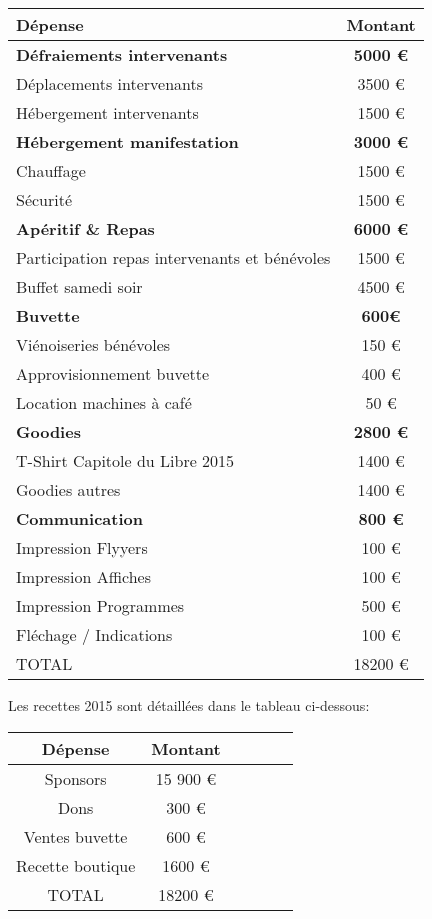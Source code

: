     \begin{tabular}{|l|c|}
        \hline Dépense & Montant \\
        \hline \textbf{Défraiements intervenants} & \textbf{5000 €} \\
        \hline Déplacements intervenants & 3500 € \\
        \hline Hébergement intervenants & 1500 € \\
        \hline \textbf{Hébergement manifestation} & \textbf{3000 €}\\
        \hline Chauffage & 1500 € \\
        \hline Sécurité & 1500 € \\
        \hline \textbf{Apéritif \& Repas} & \textbf{6000 € }\\
        \hline Participation repas intervenants et bénévoles & 1500 € \\
        \hline Buffet samedi soir & 4500 € \\
        \hline \textbf{Buvette} & \textbf{600€ }\\
        \hline Viénoiseries bénévoles & 150 € \\
        \hline Approvisionnement buvette & 400 € \\
        \hline Location machines à café & 50 € \\
        \hline \textbf{Goodies} & \textbf{2800 € }\\
        \hline T-Shirt Capitole du Libre 2015 & 1400 € \\
        \hline Goodies autres & 1400 € \\
        \hline \textbf{Communication} & \textbf{800 €} \\
        \hline Impression Flyyers & 100 € \\
        \hline Impression Affiches & 100 € \\
        \hline Impression Programmes & 500 € \\
        \hline Fléchage / Indications & 100 € \\
        \hline TOTAL & 18200 € \\
        \hline
    \end{tabular}

\Separateur

Les recettes 2015 sont détaillées dans le tableau ci-dessous:

    \begin{tabular}{|c|c|c|c|c|c|}
        \hline Dépense & Montant \\
        \hline Sponsors & 15 900 € \\
        \hline Dons & 300 € \\
        \hline Ventes buvette & 600 € \\
        \hline Recette boutique & 1600 € \\
        \hline TOTAL & 18200 € \\
        \hline
    \end{tabular}

